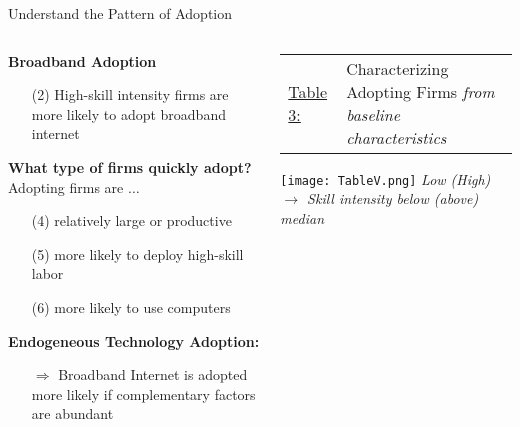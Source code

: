 \documentclass[compress, aspectratio=169, xcolor=dvipsnames]{beamer}
\begin{document}
\begin{frame}{Understand the Pattern of Adoption}

\begin{columns}
	
\begin{column}{0.55\textwidth}
\textbf{Broadband Adoption}
\begin{itemize}
	\item[(2)] High-skill intensity firms are more likely to adopt broadband internet
\end{itemize}
\vspace{5pt}
\textbf{What type of firms quickly adopt?} \\
Adopting firms are $\dots$
\begin{itemize}
	\item[(4)] relatively large or productive
	\item[(5)] more likely to deploy high-skill labor
	\item[(6)] more likely to use computers
\end{itemize}
\vspace{5pt}
\textbf{Endogeneous Technology Adoption:}
\begin{itemize}
	\item[$\Rightarrow$] Broadband Internet is adopted more likely if complementary factors are abundant
\end{itemize}


\end{column}

\begin{column}{0.45\textwidth}
	\centering
	\scriptsize{
	\begin{tabular}{l p{5cm}}
 	\underline{Table 3:} & Characterizing Adopting Firms \newline \textit{from baseline characteristics}
 	\end{tabular}}
 	
    \texttt{[image: TableV.png]}\qquad
    \tiny
    \textit{Low (High) $\rightarrow$ Skill intensity below (above) median}
    
\end{column}
	
\end{columns}
	
\end{frame}


\end{document}
